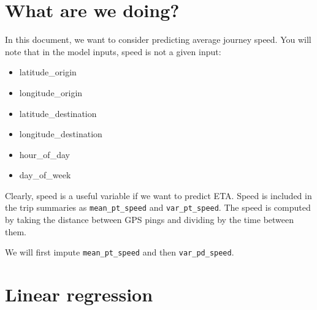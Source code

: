 \documentclass[]{article}
\providecommand{\tightlist}{%
  \setlength{\itemsep}{0pt}\setlength{\parskip}{0pt}}
\begin{document}
\hypertarget{what-are-we-doing}{%
\section{What are we doing?}\label{what-are-we-doing}}

In this document, we want to consider predicting average journey speed.
You will note that in the model inputs, speed is not a given input:

\begin{itemize}
\tightlist
\item
  latitude\_origin
\item
  longitude\_origin
\item
  latitude\_destination
\item
  longitude\_destination
\item
  hour\_of\_day
\item
  day\_of\_week
\end{itemize}

Clearly, speed is a useful variable if we want to predict ETA. Speed is
included in the trip summaries as \texttt{mean\_pt\_speed} and
\texttt{var\_pt\_speed}. The speed is computed by taking the distance
between GPS pings and dividing by the time between them.

We will first impute \texttt{mean\_pt\_speed} and then
\texttt{var\_pd\_speed}.

\hypertarget{linear-regression}{%
\section{Linear regression}\label{linear-regression}}
\end{document}
